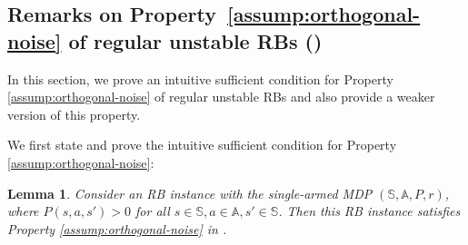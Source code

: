 \documentclass[11pt,letterpaper]{article}
\theoremstyle{plain}
\newtheorem{lemma}{Lemma}
\theoremstyle{definition}
\theoremstyle{remark}
\newcommand{\sspa}{\mathbb{S}}
\newcommand{\aspa}{\mathbb{A}}
\begin{document}
\subsection{Remarks on Property~\ref{assump:orthogonal-noise} of regular unstable RBs ()}
\label{app:remark-noise-assumption}

In this section, we prove an intuitive sufficient condition for Property \ref{assump:orthogonal-noise} of regular unstable RBs and also provide a weaker version of this property. 

We first state and prove the intuitive sufficient condition for Property \ref{assump:orthogonal-noise}: 

\begin{lemma}\label{lem:assump-6-helper}
    Consider an RB instance with the single-armed MDP $(\sspa, \aspa, P, r)$, where $P(s,a,s') > 0$ for all $s\in\sspa, a\in\aspa, s'\in\sspa$. 
    Then this RB instance satisfies Property \ref{assump:orthogonal-noise} in . 
\end{lemma}
\end{document}
